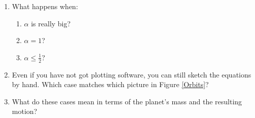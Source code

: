 \documentclass[]{article}
\newcommand{\fig}[1]{Figure \ref{#1}}
\begin{document}
\begin{enumerate}
\item What happens when:
\begin{enumerate}
\item  $\alpha$ is really big?
\item  $\alpha=1$?
\item  $\alpha\leq \frac{1}{2}$?
\end{enumerate}

\item Even if you have not got plotting software, you can still sketch the equations by hand. Which case matches which picture in \fig{Orbits}?

\item What do these cases mean in terms of the planet's mass and the resulting motion?

\end{enumerate}
\end{document}
